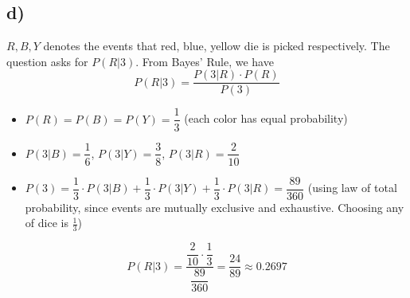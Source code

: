 \documentclass[12pt]{article}
\begin{document}
\subsection*{d)} 
$R,B,Y$ denotes the events that red, blue, yellow die is picked respectively. The question asks for $P(R|3)$. From Bayes' Rule, we have
$$P(R | 3) = \dfrac{P(3|R) \cdot P(R)}{P(3)}$$

\begin{itemize}
    \item $P(R) = P(B) = P(Y) = \dfrac{1}{3}$ (each color has equal probability)
    \item $P(3|B) = \dfrac{1}{6}$, $P(3|Y) = \dfrac{3}{8}$, $P(3|R) = \dfrac{2}{10}$
    \item $P(3) = \dfrac{1}{3} \cdot P(3|B) + \dfrac{1}{3} \cdot P(3|Y) + \dfrac{1}{3} \cdot P(3|R) = \dfrac{89}{360}$ (using law of total probability, since events are mutually exclusive and exhaustive. Choosing any of dice is $\frac{1}{3}$)
\end{itemize}
$$P(R | 3) = \dfrac{\dfrac{2}{10} \cdot \dfrac{1}{3}}{\dfrac{89}{360}} = \dfrac{24}{89} \approx 0.2697$$
\end{document}
